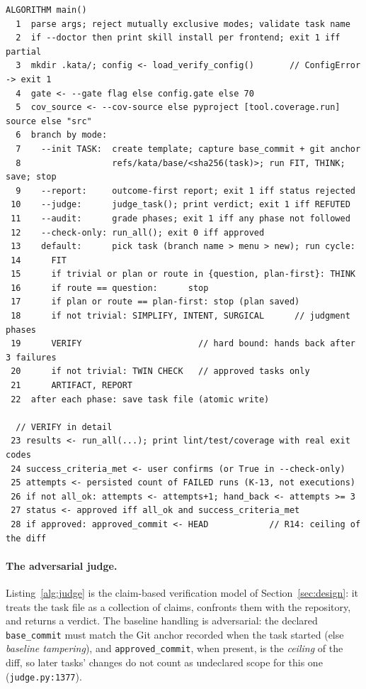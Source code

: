 \documentclass[11pt]{article}
\begin{document}
\begin{lstlisting}[caption=cycle orchestration (kata/cli.py).,label=alg:cycle]
ALGORITHM main()
  1  parse args; reject mutually exclusive modes; validate task name
  2  if --doctor then print skill install per frontend; exit 1 iff partial
  3  mkdir .kata/; config <- load_verify_config()       // ConfigError -> exit 1
  4  gate <- --gate flag else config.gate else 70
  5  cov_source <- --cov-source else pyproject [tool.coverage.run] source else "src"
  6  branch by mode:
  7    --init TASK:  create template; capture base_commit + git anchor
  8                  refs/kata/base/<sha256(task)>; run FIT, THINK; save; stop
  9    --report:     outcome-first report; exit 1 iff status rejected
 10    --judge:      judge_task(); print verdict; exit 1 iff REFUTED
 11    --audit:      grade phases; exit 1 iff any phase not followed
 12    --check-only: run_all(); exit 0 iff approved
 13    default:      pick task (branch name > menu > new); run cycle:
 14      FIT
 15      if trivial or plan or route in {question, plan-first}: THINK
 16      if route == question:      stop
 17      if plan or route == plan-first: stop (plan saved)
 18      if not trivial: SIMPLIFY, INTENT, SURGICAL      // judgment phases
 19      VERIFY                       // hard bound: hands back after 3 failures
 20      if not trivial: TWIN CHECK   // approved tasks only
 21      ARTIFACT, REPORT
 22  after each phase: save task file (atomic write)

  // VERIFY in detail
 23 results <- run_all(...); print lint/test/coverage with real exit codes
 24 success_criteria_met <- user confirms (or True in --check-only)
 25 attempts <- persisted count of FAILED runs (K-13, not executions)
 26 if not all_ok: attempts <- attempts+1; hand_back <- attempts >= 3
 27 status <- approved iff all_ok and success_criteria_met
 28 if approved: approved_commit <- HEAD            // R14: ceiling of the diff
\end{lstlisting}

\paragraph{The adversarial judge.} Listing~\ref{alg:judge} is the
claim-based verification model of Section~\ref{sec:design}: it treats the
task file as a collection of claims, confronts them with the repository,
and returns a verdict. The baseline handling is adversarial: the declared
\texttt{base\_commit} must match the Git anchor recorded when the task
started (else \emph{baseline tampering}), and \texttt{approved\_commit},
when present, is the \emph{ceiling} of the diff, so later tasks' changes
do not count as undeclared scope for this one (\texttt{judge.py:1377}).
\end{document}
